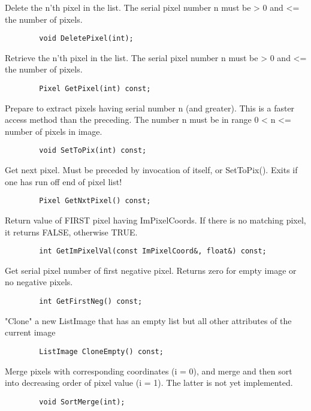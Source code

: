            Delete the n'th pixel in the list. The serial pixel number
           n must be > 0 and <= the number of pixels.
\begin{verbatim}
        void DeletePixel(int);
\end{verbatim}

           Retrieve the n'th pixel in the list. The serial pixel number
           n must be > 0 and <= the number of pixels.
\begin{verbatim}
        Pixel GetPixel(int) const;
\end{verbatim}

           Prepare to extract pixels having serial number n (and
           greater). This is a faster access method than the
           preceding. The number n must be in range 0 < n <= number
           of pixels in image.
\begin{verbatim}
        void SetToPix(int) const;
\end{verbatim}

           Get next pixel. Must be preceded by invocation of itself,
           or SetToPix(). Exits if one has run off end of
           pixel list!
\begin{verbatim}
        Pixel GetNxtPixel() const;
\end{verbatim}

           Return value of FIRST pixel having ImPixelCoords. If there is no
           matching pixel, it returns FALSE, otherwise TRUE.
\begin{verbatim}
        int GetImPixelVal(const ImPixelCoord&, float&) const;
\end{verbatim}

           Get serial pixel number of first negative pixel. Returns 
           zero for empty image or no negative pixels.
\begin{verbatim}
        int GetFirstNeg() const;
\end{verbatim}

           "Clone" a new ListImage that has an empty list but all
           other attributes of the current image
\begin{verbatim}
        ListImage CloneEmpty() const;
\end{verbatim}

           Merge pixels with corresponding coordinates (i = 0), and
           merge and then sort into decreasing order of pixel value
           (i = 1). The latter is not yet implemented.
\begin{verbatim}
        void SortMerge(int);
\end{verbatim}

